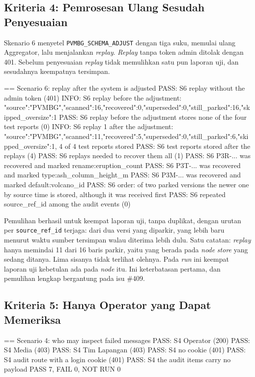 \subsection{Kriteria 4: Pemrosesan Ulang Sesudah Penyesuaian}

Skenario 6 menyetel \texttt{PVMBG\_SCHEMA\_ADJUST} dengan tiga suku, memulai ulang Aggregator, lalu menjalankan \textit{replay}. \textit{Replay} tanpa token admin ditolak dengan 401. Sebelum penyesuaian \textit{replay} tidak memulihkan satu pun laporan uji, dan sesudahnya keempatnya tersimpan.

\begin{codebox}
== Scenario 6: replay after the system is adjusted
PASS: S6 replay without the admin token (401)
INFO: S6 replay before the adjustment: {"source":"PVMBG","scanned":16,"recovered":0,"superseded":0,"still_parked":16,"skipped_oversize":1}
PASS: S6 replay before the adjustment stores none of the four test reports (0)
INFO: S6 replay 1 after the adjustment: {"source":"PVMBG","scanned":11,"recovered":5,"superseded":0,"still_parked":6,"skipped_oversize":1}, 4 of 4 test reports stored
PASS: S6 test reports stored after the replays (4)
PASS: S6 replays needed to recover them all (1)
PASS: S6 P3R-... was recovered and marked rename:eruption_count
PASS: S6 P3T-... was recovered and marked type:ash_column_height_m
PASS: S6 P3M-... was recovered and marked default:volcano_id
PASS: S6 order: of two parked versions the newer one by source time is stored, although it was received first
PASS: S6 repeated source_ref_id among the audit events (0)
\end{codebox}

Pemulihan berhasil untuk keempat laporan uji, tanpa duplikat, dengan urutan per \texttt{source\_ref\_id} terjaga: dari dua versi yang diparkir, yang lebih baru menurut waktu sumber tersimpan walau diterima lebih dulu. Satu catatan: \textit{replay} hanya memindai 11 dari 16 baris parkir, yaitu yang berada pada \textit{node} \textit{store} yang sedang ditanya. Lima sisanya tidak terlihat olehnya. Pada \textit{run} ini keempat laporan uji kebetulan ada pada \textit{node} itu. Ini keterbatasan pertama, dan pemulihan lengkap bergantung pada isu \#409.

\subsection{Kriteria 5: Hanya Operator yang Dapat Memeriksa}

\begin{codebox}
== Scenario 4: who may inspect failed messages
PASS: S4 Operator (200)
PASS: S4 Media (403)
PASS: S4 Tim Lapangan (403)
PASS: S4 no cookie (401)
PASS: S4 audit route with a login cookie (401)
PASS: S4 the audit items carry no payload
PASS 7, FAIL 0, NOT RUN 0
\end{codebox}

